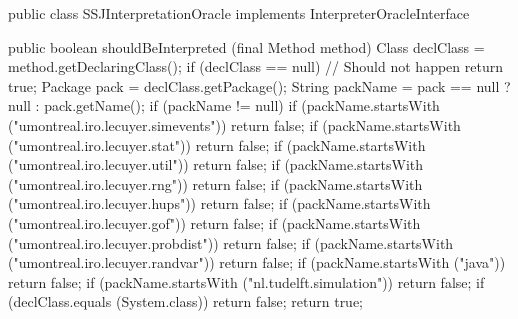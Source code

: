 \begin{code}
public class SSJInterpretationOracle implements InterpreterOracleInterface\begin{hide} {
   public boolean shouldBeInterpreted (final Method method) {
      Class declClass = method.getDeclaringClass();
      if (declClass == null)
         // Should not happen
         return true;
      Package pack = declClass.getPackage();
      String packName = pack == null ? null : pack.getName();
      if (packName != null) {
         if (packName.startsWith
                ("umontreal.iro.lecuyer.simevents"))
            return false;
         if (packName.startsWith
                ("umontreal.iro.lecuyer.stat"))
            return false;
         if (packName.startsWith
                ("umontreal.iro.lecuyer.util"))
            return false;
         if (packName.startsWith
                ("umontreal.iro.lecuyer.rng"))
            return false;
         if (packName.startsWith
                ("umontreal.iro.lecuyer.hups"))
            return false;
         if (packName.startsWith
                ("umontreal.iro.lecuyer.gof"))
            return false;
         if (packName.startsWith
                ("umontreal.iro.lecuyer.probdist"))
            return false;
         if (packName.startsWith
                ("umontreal.iro.lecuyer.randvar"))
            return false;
         if (packName.startsWith
                ("java"))
            return false;
         if (packName.startsWith
                ("nl.tudelft.simulation"))
            return false;
      }
      if (declClass.equals (System.class))
         return false;
      return true;
   }
}\end{hide}
\end{code}
